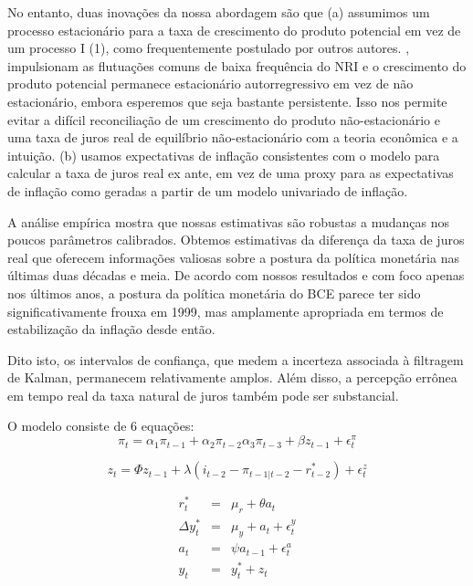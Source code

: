 \documentclass[11pt,oneside,a4paper]{article}
\begin{document}
No entanto, duas inovações da nossa abordagem são que (a) assumimos um processo estacionário para a taxa de crescimento do produto potencial em vez de um processo I (1), como frequentemente postulado por outros autores. \citet{LW:2003}, impulsionam as flutuações comuns de baixa frequência do NRI e o crescimento do produto potencial permanece estacionário autorregressivo em vez de não estacionário, embora esperemos que seja bastante persistente. Isso nos permite evitar a difícil reconciliação de um crescimento do produto não-estacionário e uma taxa de juros real de equilíbrio não-estacionário com a teoria econômica e a intuição. (b) usamos expectativas de inflação consistentes com o modelo para calcular a taxa de juros real ex ante, em vez de uma proxy para as expectativas de inflação como geradas a partir de um modelo univariado de inflação.

A análise empírica mostra que nossas estimativas são robustas a mudanças nos poucos parâmetros calibrados. Obtemos estimativas da diferença da taxa de juros real que oferecem informações valiosas sobre a postura da política monetária nas últimas duas décadas e meia. De acordo com nossos resultados e com foco apenas nos últimos anos, a postura da política monetária do BCE parece ter sido significativamente frouxa em 1999, mas amplamente apropriada em termos de estabilização da inflação desde então.

Dito isto, os intervalos de confiança, que medem a incerteza associada à filtragem de Kalman, permanecem relativamente amplos. Além disso, a percepção errônea em tempo real da taxa natural de juros também pode ser substancial.

O modelo consiste de 6 equações:
\begin{equation} \label{Eq.NKPC}
    \pi_t = \alpha_1 \pi_{t-1} + \alpha_2 \pi_{t-2} \alpha_3 \pi_{t-3} + \beta z_{t-1} + \epsilon_t^{\pi}
\end{equation}

\begin{equation} \label{Eq. IS}
    z_t = \Phi z_{t-1} + \lambda(i_{t-2} - \pi_{t-1|t-2} - r_{t-2}^{*}) + \epsilon_t^{z}
\end{equation}

\begin{eqnarray}
    r_{t}^{*} &=& \mu_r + \theta a_t \label{Eq. estado_NRI} \\
    \Delta y_t^{*} &=& \mu_y + a_t + \epsilon_t^{y}   \label{Eq. estado_outputgap} \\
    a_t &=& \psi a_{t-1} + \epsilon_t^{a} \label{Eq. estado_produtividade} \\
    y_t &=& y_t^{*} + z_t     \label{Eq. estado_potencial}
\end{eqnarray}
\end{document}
